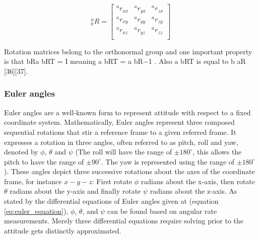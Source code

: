 \begin{equation}
    \textrm{$_{b}^{a}R$}
    =
    \begin{bmatrix}
        \textrm{$^{a}r_{xx}$} & \textrm{$^{a}r_{yx}$} & \textrm{$^{a}r_{zx}$} \\
        \textrm{$^{a}r_{xy}$} & \textrm{$^{a}r_{yy}$} & \textrm{$^{a}r_{zy}$} \\
        \textrm{$^{a}r_{xz}$} & \textrm{$^{a}r_{yz}$} & \textrm{$^{a}r_{zz}$} \\
    \end{bmatrix}
    \label{eq:axes_frames}
\end{equation}

Rotation matrices belong to the orthonormal group and one important property is that bRa bRT = I meaning a bRT = a bR−1 . Also a bRT is equal to b aR [36][37].

\subsubsection{Euler angles}

Euler angles are a well-known form to represent attitude with respect to a fixed coordinate system. Mathematically, Euler angles represent three composed sequential rotations that stir a reference frame to a given referred frame. It expresses a rotation in three angles, often referred to as pitch, roll and yaw, denoted by $\phi$, $\theta$ and $\psi$ (The roll will have the range of $\pm180^\circ$, this allows the pitch to have the range of $\pm90^{\circ}$. The yaw is represented using the range of $\pm180^{\circ}$). These angles depict three successive rotations about the axes of the coordinate frame, for instance $x-y-z$: First rotate $\phi$ radians about the x-axis, then rotate $\theta$ radians about the y-axis and finally rotate $\psi$ radians about the z-axis. As stated by the differential equations of Euler angles given at (equation \ref{eq:euler_equation}), $\phi$, $\theta$, and $\psi$ can be found based on angular rate measurements. Merely three differential equations require solving prior to the attitude gets distinctly approximated.

